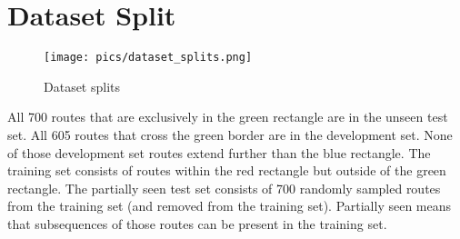 \documentclass[11pt,a4paper]{article}
\begin{document}
\section{Dataset Split}
\begin{figure}[ht]
    \centering
    \texttt{[image: pics/dataset\_splits.png]}
    \caption{Dataset splits}
    \label{fig:splits}
\end{figure}
All 700 routes that are exclusively in the green rectangle are in the unseen test set. All 605 routes that cross the green border are in the development set. None of those development set routes extend further than the blue rectangle. The training set consists of routes within the red rectangle but outside of the green rectangle. The partially seen test set consists of 700 randomly sampled routes from the training set (and removed from the training set). Partially seen means that subsequences of those routes can be present in the training set.
\end{document}
